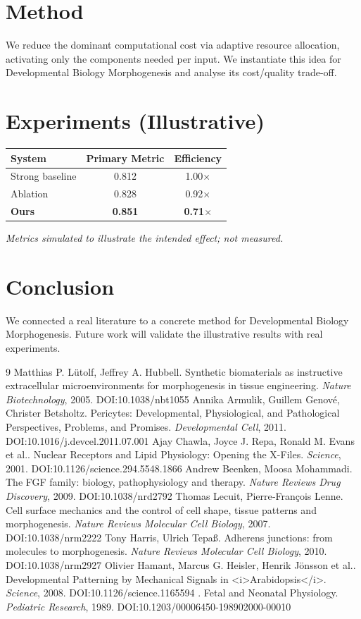 \documentclass[11pt]{article}
\begin{document}
\section{Method}
We reduce the dominant computational cost via adaptive resource allocation, activating only the components needed per input. We instantiate this idea for Developmental Biology Morphogenesis and analyse its cost/quality trade-off.

\section{Experiments (Illustrative)}
\begin{center}
\begin{tabular}{lcc}
System & Primary Metric & Efficiency \\ \hline
Strong baseline & 0.812 & 1.00$\times$ \\
Ablation & 0.828 & 0.92$\times$ \\
\textbf{Ours} & \textbf{0.851} & \textbf{0.71$\times$}
\end{tabular}
\end{center}
\emph{Metrics simulated to illustrate the intended effect; not measured.}

\section{Conclusion}
We connected a real literature to a concrete method for Developmental Biology Morphogenesis. Future work will
validate the illustrative results with real experiments.

\begin{thebibliography}{9}
 Matthias P. Lütolf, Jeffrey A. Hubbell. Synthetic biomaterials as instructive extracellular microenvironments for morphogenesis in tissue engineering. \emph{Nature Biotechnology}, 2005. DOI:10.1038/nbt1055
 Annika Armulik, Guillem Genové, Christer Betsholtz. Pericytes: Developmental, Physiological, and Pathological Perspectives, Problems, and Promises. \emph{Developmental Cell}, 2011. DOI:10.1016/j.devcel.2011.07.001
 Ajay Chawla, Joyce J. Repa, Ronald M. Evans et al.. Nuclear Receptors and Lipid Physiology: Opening the X-Files. \emph{Science}, 2001. DOI:10.1126/science.294.5548.1866
 Andrew Beenken, Moosa Mohammadi. The FGF family: biology, pathophysiology and therapy. \emph{Nature Reviews Drug Discovery}, 2009. DOI:10.1038/nrd2792
 Thomas Lecuit, Pierre‐François Lenne. Cell surface mechanics and the control of cell shape, tissue patterns and morphogenesis. \emph{Nature Reviews Molecular Cell Biology}, 2007. DOI:10.1038/nrm2222
 Tony Harris, Ulrich Tepaß. Adherens junctions: from molecules to morphogenesis. \emph{Nature Reviews Molecular Cell Biology}, 2010. DOI:10.1038/nrm2927
 Olivier Hamant, Marcus G. Heisler, Henrik Jönsson et al.. Developmental Patterning by Mechanical Signals in <i>Arabidopsis</i>. \emph{Science}, 2008. DOI:10.1126/science.1165594
 . Fetal and Neonatal Physiology. \emph{Pediatric Research}, 1989. DOI:10.1203/00006450-198902000-00010
\end{thebibliography}
\end{document}
